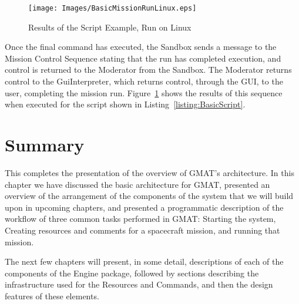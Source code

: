 \begin{figure}[H]
\begin{center}
\texttt{[image: Images/BasicMissionRunLinux.eps]}%
\caption{\label{figure:BasicScriptOutput}Results of the Script Example, Run on Linux}%
\end{center}
\end{figure}

Once the final command has executed, the Sandbox sends a message to the Mission Control Sequence
stating that the run has completed execution, and control is returned to the Moderator from the
Sandbox.  The Moderator returns control to the GuiInterpreter, which returns control, through the
GUI, to the user, completing the mission run.  Figure~\ref{figure:BasicScriptOutput} shows the
results of this sequence when executed for the script shown in Listing~\ref{listing:BasicScript}.

\section{Summary}

This completes the presentation of the overview of GMAT's architecture.  In this chapter we have
discussed the basic architecture for GMAT, presented an overview of the arrangement of the
components of the system that we will build upon in upcoming chapters, and presented a programmatic
description of the workflow of three common tasks performed in GMAT: Starting the system, Creating
resources and comments for a spacecraft mission, and running that mission.

The next few chapters will present, in some detail, descriptions of each of the components of the
Engine package, followed by sections describing the infrastructure used for the Resources and
Commands, and then the design features of these elements.